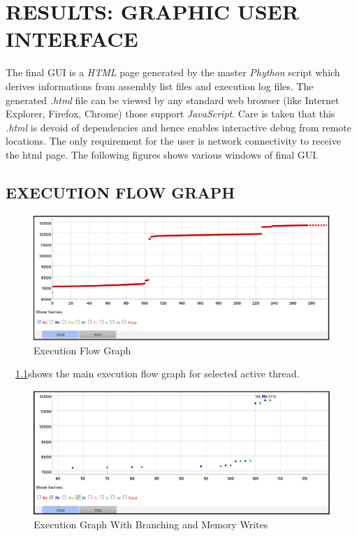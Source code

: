 \chapter{RESULTS: GRAPHIC USER INTERFACE}
\label{chap:GUI_results.tex}
The final GUI is a {\it HTML} page generated by the master {\it Phython} script which derives informations from assembly list files and execution log files. The generated {\it .html} file can be viewed by any standard web browser (like Internet Explorer, Firefox, Chrome) those support {\it JavaScript}. Care is taken that this {\it .html} is devoid of dependencies and hence enables interactive debug from remote locations. The only requirement for the user is network connectivity to receive the html page. The following figures shows various windows of final GUI.
\section {EXECUTION FLOW GRAPH}
\begin{figure}[h]
\centering
\includegraphics[width=6in]{./figures/gui_graph1.eps}
\caption{Execution Flow Graph}
\label{fig:gui_graph1.eps}
\end{figure}

~\figurename{~\ref{fig:gui_graph1.eps}}shows the main execution flow graph for selected active thread.  
\begin{figure}[h]
\centering
\includegraphics[width=6in]{./figures/gui_graph2.eps}
\caption{Execution Graph With Branching and Memory Writes}
\label{fig:gui_graph2.eps}
\end{figure}

